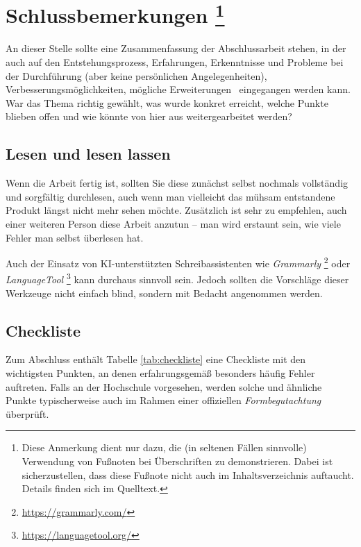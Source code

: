 \chapter[Schlussbemerkungen]{Schlussbemerkungen%
\protect\footnote{Diese Anmerkung dient nur dazu, die (in seltenen Fällen
sinnvolle) Verwendung von Fußnoten bei Überschriften zu demonstrieren.
Dabei ist sicherzustellen, dass diese Fußnote nicht auch im Inhaltsverzeichnis
auftaucht. Details finden sich im Quelltext.}}%
\label{cha:Schluss}

An dieser Stelle sollte eine Zusammenfassung der Abschlussarbeit stehen, in
der auch auf den Entstehungsprozess, Erfahrungen, Erkenntnisse und Probleme bei
der Durchführung (aber keine persönlichen Angelegenheiten), 
Verbesserungsmöglichkeiten, mögliche Erweiterungen \usw\
eingegangen werden kann. War das Thema richtig gewählt, was wurde konkret
erreicht, welche Punkte blieben offen und wie könnte von hier aus
weitergearbeitet werden?


\section{Lesen und lesen lassen}

Wenn die Arbeit fertig ist, sollten Sie diese zunächst selbst nochmals
vollständig und sorgfältig durchlesen, auch wenn man vielleicht das mühsam
entstandene Produkt längst nicht mehr sehen möchte. Zusätzlich ist sehr zu
empfehlen, auch einer weiteren Person diese Arbeit anzutun -- man wird
erstaunt sein, wie viele Fehler man selbst überlesen hat.

Auch der Einsatz von KI-unterstützten Schreibassistenten wie \zB
\emph{Grammarly}%
\footnote{\url{https://grammarly.com/}} oder \emph{LanguageTool}%
\footnote{\url{https://languagetool.org/}} kann durchaus sinnvoll sein.
Jedoch sollten die Vorschläge dieser Werkzeuge nicht einfach blind, sondern
mit Bedacht angenommen werden.


\section{Checkliste}

Zum Abschluss enthält Tabelle \ref{tab:checkliste} eine Checkliste mit den
wichtigsten Punkten, an denen erfahrungsgemäß besonders häufig Fehler
auftreten. Falls an der Hochschule vorgesehen, werden solche und ähnliche
Punkte typischerweise auch im Rahmen einer offiziellen \emph{Formbegutachtung}
überprüft.


